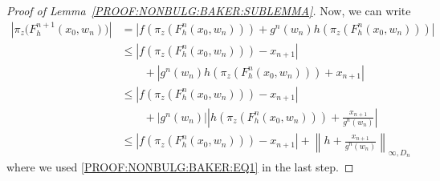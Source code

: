\documentclass[a4paper, 12pt, twoside]{amsart}
\theoremstyle{definition}
\numberwithin{equation}{section}
\begin{document}
\begin{proof}[Proof of Lemma~\ref{PROOF:NONBULG:BAKER:SUBLEMMA}]
        Now, we can write
        \begin{equation}
            \label{PROOF:NONBULG:BAKER:CONC_EQ1}
            \begin{split}
                |{\pi_z (F_h^{n+1}(x_0, w_n)})| &= |{f(\pi_z (F_h^{n}(x_0, w_n))) + g^n(w_n)h(\pi_z (F_h^{n}(x_0, w_n)))}| \\
                &\leq |f(\pi_z (F_h^{n}(x_0, w_n))) - x_{n+1}| \\
                & \qquad + |{g^n(w_n)h(\pi_z (F_h^{n}(x_0, w_n))) + x_{n+1}}| \\
                &\leq |{f(\pi_z (F_h^{n}(x_0, w_n)))- x_{n+1}}|\\
                & \qquad + |{g^n(w_n)}|\left|{h(\pi_z (F_h^{n}(x_0, w_n))) + \frac{x_{n+1}}{g^n(w_n)}}\right|\\
                &\leq |{f(\pi_z( F_h^{n}(x_0, w_n))) - x_{n+1}}| + \left\|{h +  \frac{x_{n+1}}{g^n(w_n)}}\right\|_{\infty, D_{n}}
            \end{split}
        \end{equation}
        where we used \eqref{PROOF:NONBULG:BAKER:EQ1} in the last step.


\end{proof}
\end{document}
